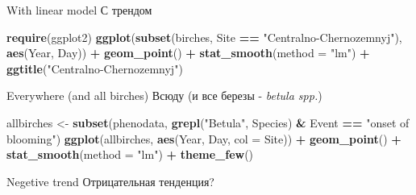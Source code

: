 \documentclass[9pt,ignorenonframetext,aspectratio=169]{beamer}
\newenvironment{Shaded}{\begin{snugshade}}{\end{snugshade}}
\newcommand{\DataTypeTok}[1]{\textcolor[rgb]{0.13,0.29,0.53}{#1}}
\newcommand{\KeywordTok}[1]{\textcolor[rgb]{0.13,0.29,0.53}{\textbf{#1}}}
\newcommand{\NormalTok}[1]{#1}
\newcommand{\OperatorTok}[1]{\textcolor[rgb]{0.81,0.36,0.00}{\textbf{#1}}}
\newcommand{\StringTok}[1]{\textcolor[rgb]{0.31,0.60,0.02}{#1}}
\begin{document}
\begin{frame}[fragile]{With linear model \textbar{} С трендом}
\protect\hypertarget{with-linear-model--}{}

\footnotesize

\begin{Shaded}
\begin{Highlighting}[]
\KeywordTok{require}\NormalTok{(ggplot2)}
\KeywordTok{ggplot}\NormalTok{(}\KeywordTok{subset}\NormalTok{(birches, Site }\OperatorTok{==}\StringTok{ "Centralno-Chernozemnyj"}\NormalTok{), }\KeywordTok{aes}\NormalTok{(Year, Day)) }\OperatorTok{+}\StringTok{ }
\StringTok{    }\KeywordTok{geom_point}\NormalTok{() }\OperatorTok{+}\StringTok{ }\KeywordTok{stat_smooth}\NormalTok{(}\DataTypeTok{method =} \StringTok{"lm"}\NormalTok{) }\OperatorTok{+}\StringTok{ }\KeywordTok{ggtitle}\NormalTok{(}\StringTok{"Centralno-Chernozemnyj"}\NormalTok{)}
\end{Highlighting}
\end{Shaded}

\end{frame}

\begin{frame}[fragile]{Everywhere (and all birches) \textbar{} Всюду (и
все березы - \emph{betula spp.})}
\protect\hypertarget{everywhere-and-all-birches------}{}

\footnotesize

\begin{Shaded}
\begin{Highlighting}[]
\NormalTok{allbirches <-}\StringTok{ }\KeywordTok{subset}\NormalTok{(phenodata, }\KeywordTok{grepl}\NormalTok{(}\StringTok{"Betula"}\NormalTok{, Species) }\OperatorTok{&}\StringTok{ }\NormalTok{Event }\OperatorTok{==}\StringTok{ "onset of blooming"}\NormalTok{)}
\KeywordTok{ggplot}\NormalTok{(allbirches, }\KeywordTok{aes}\NormalTok{(Year, Day, }\DataTypeTok{col =}\NormalTok{ Site)) }\OperatorTok{+}\StringTok{ }\KeywordTok{geom_point}\NormalTok{() }\OperatorTok{+}\StringTok{ }\KeywordTok{stat_smooth}\NormalTok{(}\DataTypeTok{method =} \StringTok{"lm"}\NormalTok{) }\OperatorTok{+}\StringTok{ }\KeywordTok{theme_few}\NormalTok{()}
\end{Highlighting}
\end{Shaded}

\normalsize Negetive trend \textbar{} Отрицательная тенденция?

\end{frame}
\end{document}
